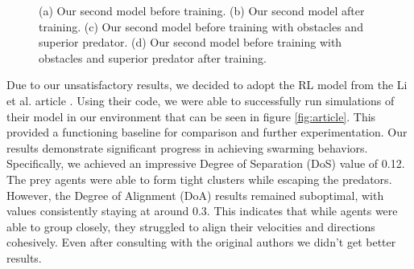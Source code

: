 \documentclass[9pt]{pnas-new}
\begin{document}
\begin{figure}[ht]
	\caption{(a) Our second model before training. (b) Our second model after training. (c) Our second model before training with obstacles and superior predator. (d) Our second model before training with obstacles and superior predator after training. }
	\label{fig:second}
\end{figure}

Due to our unsatisfactory results, we decided to adopt the RL model from the Li et al. article \cite{li2023predator}.
Using their code, we were able to successfully run simulations of their model in our environment that can be seen in figure \ref{fig:article}. 
This provided a functioning baseline for comparison and further experimentation.
Our results demonstrate significant progress in achieving swarming behaviors. 
Specifically, we achieved an impressive Degree of Separation (DoS) value of 0.12.
The prey agents were able to form tight clusters while escaping the predators.
However, the Degree of Alignment (DoA) results remained suboptimal, with values consistently staying at around 0.3.
This indicates that while agents were able to group closely, they struggled to align their velocities and directions cohesively. 
Even after consulting with the original authors we didn't get better results.
\end{document}
